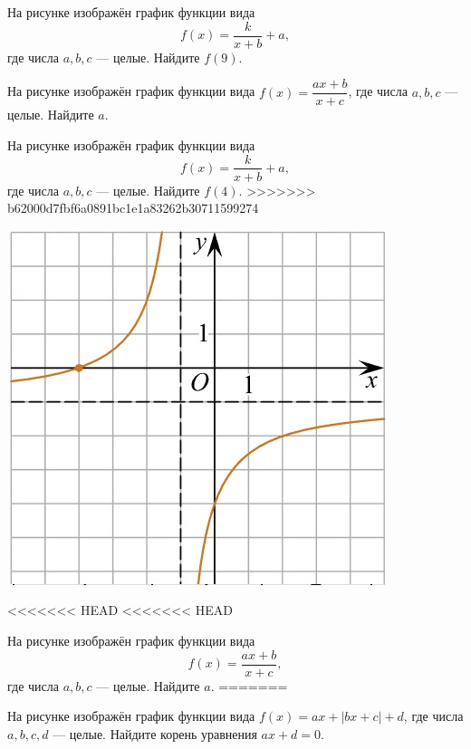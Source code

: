 \begin{class}[number=5]
\begin{listofex}
\begin{minipage}[t]{\bodywidth}
\begin{minipage}[t]{\bodywidth}
\begin{minipage}[t]{\bodywidth}
\begin{minipage}[t]{\bodywidth}
\begin{minipage}[t]{0.43\textwidth}
\begin{minipage}[t]{\bodywidth}
\begin{minipage}[t]{0.43\textwidth}
\begin{minipage}[t]{\bodywidth}
\begin{minipage}[t]{0.43\textwidth}
		\begin{minipage}[t]{\bodywidth}
			На рисунке изображён график функции вида \[ f(x)=\dfrac{k}{x+b}+a, \] где числа \(a, b, c\) --- целые. Найдите \(f(9)\).
		\begin{minipage}[t]{0.43\textwidth}
			На рисунке изображён график функции вида \(f(x)=\dfrac{ax+b}{x+c}\), где числа \(a, b, c\) --- целые. Найдите \(a\).
		\begin{minipage}[t]{\bodywidth}
			На рисунке изображён график функции вида \[ f(x)=\dfrac{k}{x+b}+a, \] где числа \(a, b, c\) --- целые. Найдите \(f(4)\).
>>>>>>> b62000d7fbf6a0891bc1e1a83262b30711599274
		\end{minipage}
		\hspace{0.05\linewidth}
		\begin{minipage}[t]{\picwidth}
			\includegraphics[align=t, width=\linewidth]{../pics/G101M4C5-3.jpg}
		\end{minipage}
		\item
<<<<<<< HEAD
<<<<<<< HEAD
		\begin{minipage}[t]{\bodywidth}
			На рисунке изображён график функции вида \[ f(x)=\dfrac{ax+b}{x+c}, \] где числа \(a, b, c\) --- целые. Найдите \(a\).
=======
		\begin{minipage}[t]{0.43\textwidth}
			На рисунке изображён график функции вида \(f(x)=ax+|bx+c|+d\), где числа \(a, b, c, d\) --- целые. Найдите корень уравнения \(ax+d=0\).

\end{minipage}
\end{minipage}
\end{minipage}
\end{minipage}
\end{minipage}
\end{minipage}
\end{minipage}
\end{minipage}
\end{minipage}
\end{minipage}
\end{minipage}
\end{minipage}
\end{minipage}
\end{listofex}
\end{class}
